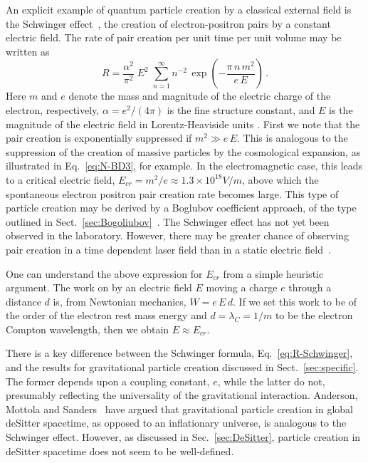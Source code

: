 \documentclass[12pt,onecolumn,eqsecnum,floats,aps,prd,floatfix,titlepage]{revtex4-2}
\begin{document}
An explicit example of quantum particle creation by a classical external field is the Schwinger effect~\cite{Schwinger},
the creation of electron-positron pairs by a constant electric field. The rate of pair creation per unit time per unit 
volume may be written as
\begin{equation}
R = \frac{\alpha^2}{\pi^2}\; E^2\; \sum_{n=1}^\infty n^{-2}\, \exp\left(-\frac{\pi\, n\, m^2}{e\, E} \right)\,.
\label{eq:R-Schwinger} 
 \end{equation}
Here $m$ and $e$ denote the mass and magnitude of the electric charge of the electron, respectively, $\alpha = e^2/(4 \pi)$ is the fine structure
constant, and $E$ is the magnitude of the electric field in Lorentz-Heaviside units . First we note that the pair creation is exponentially suppressed if $m^2 \gg e\, E$.
This is analogous to the suppression of the creation of massive particles by the cosmological expansion, as illustrated in Eq.~\eqref{eq:N-BD3},
for example.  In the electromagnetic case, this leads to a critical electric field, $E_{cr} = m^2/e \approx  1.3 \times 10^{18} V/m$, above which the spontaneous 
electron positron pair  creation rate becomes large. This type of particle creation may be derived by a Boglubov coefficient approach, of the type outlined in
Sect.~\ref{sec:Bogoliubov}~\cite{Grib94}. The Schwinger effect has not yet been observed in the laboratory. However, there may be greater chance of
observing pair  creation in a time dependent laser field than in a static electric field~\cite{Dunne09}.

One can understand the above expression for $E_{cr}$ from a simple heuristic argument. The work on by an electric field $E$ moving a charge
$e$ through a distance $d$ is, from Newtonian mechanics, $W = e\, E\, d$. If we set this work to be of the order of the electron rest mass energy
and $d =\lambda_C = 1/m$ to be the electron Compton wavelength, then we obtain $E\approx E_{cr}$.

There is a key difference between the Schwinger formula, Eq.~\eqref{eq:R-Schwinger}, and the results for gravitational particle creation discussed
in Sect.~\ref{sec:specific}. The former depends upon a coupling constant, $e$, while the latter do not, presumably reflecting the universality of the
gravitational  interaction. Anderson, Mottola and Sanders~\cite{AM14,AMS18}   have argued that gravitational particle creation in global deSitter spacetime, 
as opposed to an inflationary universe, is analogous to the Schwinger effect. However, as discussed in Sec.~\ref{sec:DeSitter}, particle creation in  
deSitter spacetime does not seem to be well-defined.
 
\end{document}
